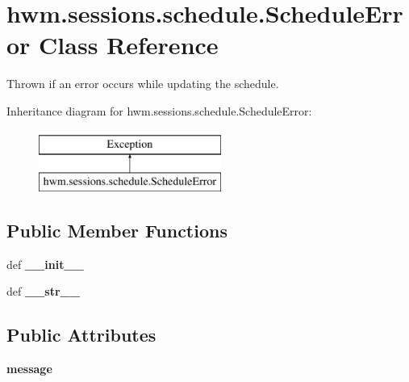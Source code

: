 \hypertarget{classhwm_1_1sessions_1_1schedule_1_1_schedule_error}{\section{hwm.\-sessions.\-schedule.\-Schedule\-Error Class Reference}
\label{classhwm_1_1sessions_1_1schedule_1_1_schedule_error}
}


Thrown if an error occurs while updating the schedule.  


Inheritance diagram for hwm.\-sessions.\-schedule.\-Schedule\-Error\-:\begin{figure}[H]
\begin{center}
\leavevmode
\includegraphics[height=2.000000cm]{classhwm_1_1sessions_1_1schedule_1_1_schedule_error}
\end{center}
\end{figure}
\subsection*{Public Member Functions}
\begin{DoxyCompactItemize}
\item 
\hypertarget{classhwm_1_1sessions_1_1schedule_1_1_schedule_error_a54b718926324fab8a518127c0ba3ff7f}{def {\bfseries \-\_\-\-\_\-init\-\_\-\-\_\-}}\label{classhwm_1_1sessions_1_1schedule_1_1_schedule_error_a54b718926324fab8a518127c0ba3ff7f}

\item 
\hypertarget{classhwm_1_1sessions_1_1schedule_1_1_schedule_error_addea671dca21e3b2fe1274fca5816ef2}{def {\bfseries \-\_\-\-\_\-str\-\_\-\-\_\-}}\label{classhwm_1_1sessions_1_1schedule_1_1_schedule_error_addea671dca21e3b2fe1274fca5816ef2}

\end{DoxyCompactItemize}
\subsection*{Public Attributes}
\begin{DoxyCompactItemize}
\item 
\hypertarget{classhwm_1_1sessions_1_1schedule_1_1_schedule_error_ac72ecae1b17d7b2eb5fe716316e18393}{{\bfseries message}}\label{classhwm_1_1sessions_1_1schedule_1_1_schedule_error_ac72ecae1b17d7b2eb5fe716316e18393}

\end{DoxyCompactItemize}


